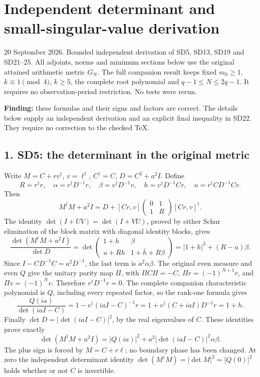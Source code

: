 \documentclass{article}
\begin{document}
\section{Independent determinant and small-singular-value derivation}\label{independent-determinant-and-small-singular-value-derivation}

20 September 2026. Bounded independent derivation of SD5, SD13, SD19 and SD21--25. All adjoints, norms and minimum sections below use the original attained arithmetic metric \(G_N\). The full companion result keeps fixed \(m_0\ge1\), \(k\equiv1\pmod4\), \(k\ge5\), the complete root polynomial and \(q-1\le N\le2q-1\). It requires no observation-period restriction. No tests were rerun.

\textbf{Finding:} these formulas and their signs and factors are correct. The details below supply an independent derivation and an explicit final inequality in SD22. They require no correction to the checked TeX.

\subsection{1. SD5: the determinant in the original metric}\label{sd5-the-determinant-in-the-original-metric}

Write \(M=C+rv^\dagger\), \(v=\ell^\dagger\), \(C^\dagger=C\), \(D=C^2+a^2I\). Define \[
R=r^\dagger r,\quad
\alpha=r^\dagger D^{-1}r,\quad
\beta=v^\dagger D^{-1}v,\quad
h=v^\dagger D^{-1}Cr,\quad
u=r^\dagger CD^{-1}Cr.
\] Then \[
M^\dagger M+a^2I
=D+[Cr,v]\begin{pmatrix}0&1\\1&R\end{pmatrix}[Cr,v]^\dagger.
\] The identity \(\det(I+UV)=\det(I+VU)\), proved by either Schur elimination of the block matrix with diagonal identity blocks, gives \[
\frac{\det(M^\dagger M+a^2I)}{\det D}
=\det\begin{pmatrix}1+h&\beta\\u+Rh&1+\bar h+R\beta\end{pmatrix}
=|1+h|^2+(R-u)\beta.
\] Since \(I-CD^{-1}C=a^2D^{-1}\), the last term is \(a^2\alpha\beta\). The original even measure and even \(Q\) give the unitary parity map \(\Pi\), with \(\Pi C\Pi=-C\), \(\Pi r=(-1)^{N+1}r\), and \(\Pi v=(-1)^Nv\). Therefore \(v^\dagger D^{-1}r=0\). The complete companion characteristic polynomial is \(Q\), including every repeated factor, so the rank-one formula gives \[
\frac{Q(ia)}{\det(iaI-C)}
=1-v^\dagger(iaI-C)^{-1}r
=1+v^\dagger(C+iaI)D^{-1}r=1+h.
\] Finally \(\det D=|\det(iaI-C)|^2\), by the real eigenvalues of \(C\). These identities prove exactly \[
\det(M^\dagger M+a^2I)
=|Q(ia)|^2+a^2|\det(iaI-C)|^2\alpha\beta.
\] The plus sign is forced by \(M=C+r\ell\); no boundary phase has been changed. At zero the independent determinant identity \(\det(M^\dagger M)=|\det M|^2=|Q(0)|^2\) holds whether or not \(C\) is invertible.
\end{document}
